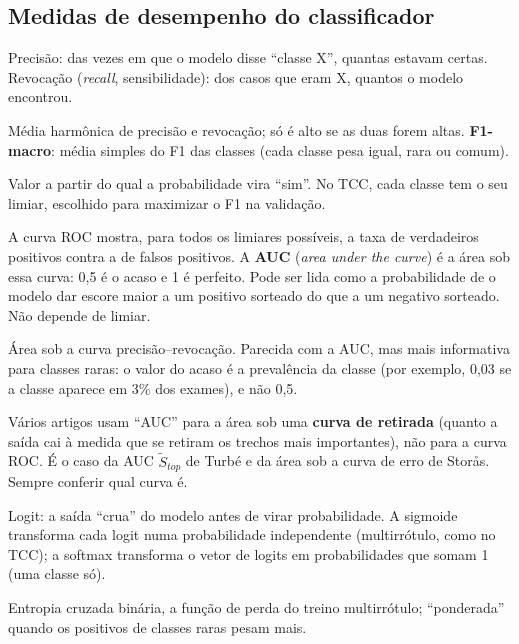 \documentclass[11pt,a4paper]{article}
\begin{document}
\subsection{Medidas de desempenho do classificador}
\begin{description}[leftmargin=0pt, style=sameline]
\item[Precisão e revocação.] Precisão: das vezes em que o modelo disse ``classe X'', quantas estavam certas. Revocação (\textit{recall}, sensibilidade): dos casos que eram X, quantos o modelo encontrou.
\item[F1.] Média harmônica de precisão e revocação; só é alto se as duas forem altas. \textbf{F1-macro}: média simples do F1 das classes (cada classe pesa igual, rara ou comum).
\item[Limiar.] Valor a partir do qual a probabilidade vira ``sim''. No TCC, cada classe tem o seu limiar, escolhido para maximizar o F1 na validação.
\item[Curva ROC e AUC (AUROC).] A curva ROC mostra, para todos os limiares possíveis, a taxa de verdadeiros positivos contra a de falsos positivos. A \textbf{AUC} (\textit{area under the curve}) é a área sob essa curva: 0,5 é o acaso e 1 é perfeito. Pode ser lida como a probabilidade de o modelo dar escore maior a um positivo sorteado do que a um negativo sorteado. Não depende de limiar.
\item[AUPRC.] Área sob a curva precisão–revocação. Parecida com a AUC, mas mais informativa para classes raras: o valor do acaso é a prevalência da classe (por exemplo, 0,03 se a classe aparece em 3\% dos exames), e não 0,5.
\item[AUC em métricas de explicação.] Vários artigos usam ``AUC'' para a área sob uma \textbf{curva de retirada} (quanto a saída cai à medida que se retiram os trechos mais importantes), não para a curva ROC. É o caso da AUC $\tilde{S}_{top}$ de Turbé e da área sob a curva de erro de Storås. Sempre conferir qual curva é.
\item[Logit, sigmoide, softmax.] Logit: a saída ``crua'' do modelo antes de virar probabilidade. A sigmoide transforma cada logit numa probabilidade independente (multirrótulo, como no TCC); a softmax transforma o vetor de logits em probabilidades que somam 1 (uma classe só).
\item[BCE.] Entropia cruzada binária, a função de perda do treino multirrótulo; ``ponderada'' quando os positivos de classes raras pesam mais.
\end{description}
\end{document}
